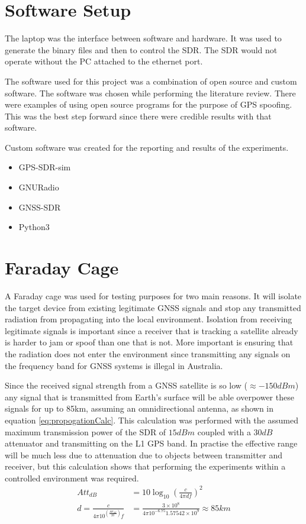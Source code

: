 \section{Software Setup}
The laptop was the interface between software and hardware. It was used to generate the binary files and then to control the SDR. The SDR would not operate without the
PC attached to the ethernet port.

The software used for this project was a combination of open source and custom software. 
The software was chosen while performing the literature review. There were examples \cite{RN4} \cite{RN28} of using open source programs
for the purpose of GPS spoofing. This was the best step forward since there were credible results with that software.

Custom software was created for the reporting and results of the experiments. 

\begin{itemize}
    \item GPS-SDR-sim
    \item GNURadio
    \item GNSS-SDR
    \item Python3
\end{itemize}

\section{Faraday Cage} \label{sec:FaraCage}
A Faraday cage was used for testing purposes for two main reasons. It will isolate the target device from existing legitimate GNSS signals and stop any transmitted
radiation from propagating into the local environment. Isolation from receiving legitimate signals is important since a receiver that is tracking a satellite already is
harder to jam or spoof than one that is not. More important is ensuring that the radiation does not enter the environment since transmitting any signals on the frequency
band for GNSS systems is illegal in Australia. 

Since the received signal strength from a GNSS satellite is so low ($\approx -150dBm$) any signal that is transmitted from Earth's surface will be able overpower these
signals for up to 85km, assuming an omnidirectional antenna, as shown in equation \ref{eq:propogationCalc}. This calculation was performed with the assumed maximum
transmission power of the SDR of $15 dBm$ coupled with a $30dB$ attenuator and transmitting on the L1 GPS band. In practise the effective range will be much less due to
attenuation due to objects between transmitter and receiver, but this calculation shows that performing the experiments within a controlled environment was required.
\begin{equation}    
    \begin{split} \label{eq:propogationCalc}
        Att_{dB} &= 10 \log_{10}\left(\frac{c}{4\pi df}\right)^2 \\
        d = \frac{c}{4\pi 10^{\left(\frac{Att_{dB}}{20}\right)}f} &= \frac{3\times10^8}{4\pi 10^{-6.75}1.57542\times 10^9} \approx 85km
    \end{split}
\end{equation}

